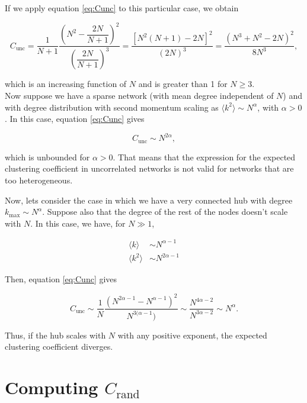 \documentclass{article}
\begin{document}
If we apply equation \ref{eq:Cunc} to this particular case, we obtain

\begin{equation}
    C_{\mathrm{unc}} = \dfrac{1}{N+1}\dfrac{\left(N^2-\dfrac{2N}{N+1} \right)^2}{\left(\dfrac{2N}{N+1} \right)^3}= \dfrac{\left[N^2(N+1)-2N\right]^2}{(2N)^3} = \dfrac{(N^3+N^2-2N)^2}{8N^3},
\end{equation}

which is an increasing function of $N$ and is greater than 1 for $N \geq 3$.
\\

Now suppose we have a sparse network (with mean degree independent of $N$) and with degree distribution with second momentum scaling as $\langle k^2 \rangle \sim N^{\alpha}$, with $\alpha > 0$. In this case, equation \ref{eq:Cunc} gives

\begin{equation}
    C_{\mathrm{unc}} \sim N^{2\alpha},
\end{equation}

which is unbounded for $\alpha > 0$. That means that the expression for the expected clustering coefficient in uncorrelated networks is not valid for networks that are too heterogeneous. 

Now, lets consider the case in which we have a very connected hub with degree $k_{\mathrm{max}} \sim N^{\alpha}$. Suppose also that the degree of the rest of the nodes doesn't scale with $N$. In this case, we have, for $N\gg 1$, 

\begin{align}
    \langle k \rangle &\sim N^{\alpha - 1} \nonumber \\
    \langle k^2 \rangle &\sim N^{2\alpha-1} \nonumber 
\end{align}

Then, equation \ref{eq:Cunc} gives 

\begin{equation}
    C_{\mathrm{unc}} \sim \dfrac{1}{N} \dfrac{(N^{2\alpha-1} - N^{\alpha - 1})^2}{N^{3(\alpha - 1})} \sim \dfrac{N^{4\alpha-2}}{N^{3\alpha-2}} \sim N^{\alpha}.
\end{equation}

Thus, if the hub scales with $N$ with any positive exponent, the expected clustering coefficient diverges.

\section{Computing $C_{\mathrm{rand}}$}
\end{document}

